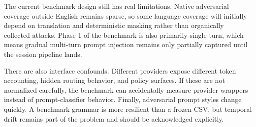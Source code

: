 The current benchmark design still has real limitations. Native adversarial coverage outside English remains sparse, so some language coverage will initially depend on translation and deterministic masking rather than organically collected attacks. Phase 1 of the benchmark is also primarily single-turn, which means gradual multi-turn prompt injection remains only partially captured until the session pipeline lands.

There are also interface confounds. Different providers expose different token accounting, hidden routing behavior, and policy surfaces. If these are not normalized carefully, the benchmark can accidentally measure provider wrappers instead of prompt-classifier behavior. Finally, adversarial prompt styles change quickly. A benchmark grammar is more resilient than a frozen CSV, but temporal drift remains part of the problem and should be acknowledged explicitly.
